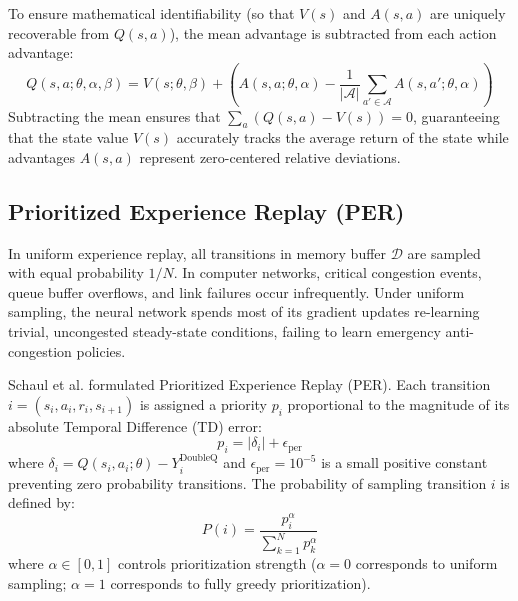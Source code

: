 \documentclass[12pt,a4paper,oneside]{report}
\begin{document}
To ensure mathematical identifiability (so that $V(s)$ and $A(s, a)$ are uniquely recoverable from $Q(s, a)$), the mean advantage is subtracted from each action advantage:
\begin{equation}
    Q(s, a; \theta, \alpha, \beta) = V(s; \theta, \beta) + \left( A(s, a; \theta, \alpha) - \frac{1}{|\mathcal{A}|} \sum_{a' \in \mathcal{A}} A(s, a'; \theta, \alpha) \right)
    \label{eq:dueling_identifiability}
\end{equation}
Subtracting the mean ensures that $\sum_a (Q(s, a) - V(s)) = 0$, guaranteeing that the state value $V(s)$ accurately tracks the average return of the state while advantages $A(s, a)$ represent zero-centered relative deviations.

\subsection{Prioritized Experience Replay (PER)}
In uniform experience replay, all transitions in memory buffer $\mathcal{D}$ are sampled with equal probability $1/N$. In computer networks, critical congestion events, queue buffer overflows, and link failures occur infrequently. Under uniform sampling, the neural network spends most of its gradient updates re-learning trivial, uncongested steady-state conditions, failing to learn emergency anti-congestion policies.

Schaul et al. \cite{schaul2016prioritized} formulated Prioritized Experience Replay (PER). Each transition $i = (s_i, a_i, r_i, s_{i+1})$ is assigned a priority $p_i$ proportional to the magnitude of its absolute Temporal Difference (TD) error:
\begin{equation}
    p_i = |\delta_i| + \epsilon_{\text{per}}
    \label{eq:per_priority}
\end{equation}
where $\delta_i = Q(s_i, a_i; \theta) - Y_i^{\text{DoubleQ}}$ and $\epsilon_{\text{per}} = 10^{-5}$ is a small positive constant preventing zero probability transitions. The probability of sampling transition $i$ is defined by:
\begin{equation}
    P(i) = \frac{p_i^\alpha}{\sum_{k=1}^N p_k^\alpha}
    \label{eq:per_sampling_prob}
\end{equation}
where $\alpha \in [0, 1]$ controls prioritization strength ($\alpha = 0$ corresponds to uniform sampling; $\alpha = 1$ corresponds to fully greedy prioritization).
\end{document}
